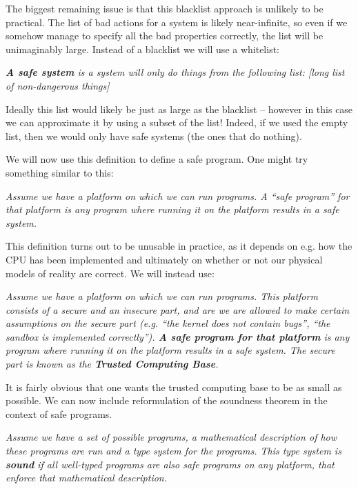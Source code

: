 The biggest remaining issue is that this blacklist approach is unlikely to be
practical. The list of bad actions for a system is likely near-infinite, so even
if we somehow manage to specify all the bad properties correctly, the list will
be unimaginably large. Instead of a blacklist we will use a whitelist:

\vspace{0.3cm}
\begin{addmargin}{1cm}
  {\it \textbf{A safe system} is a system will only do things from the following
    list: [long list of non-dangerous things]}
\end{addmargin}
\vspace{0.3cm}

Ideally this list would likely be just as large as the blacklist -- however in
this case we can approximate it by using a subset of the list! Indeed, if we
used the empty list, then we would only have safe systems (the ones that do
nothing).

We will now use this definition to define a safe program. One might try
something similar to this:

\vspace{0.3cm}
\begin{addmargin}{1cm}
  {\it Assume we have a platform on which we can run programs. A ``safe
    program'' for that platform is any program where running it on the platform
    results in a safe system.}
\end{addmargin}
\vspace{0.3cm}

This definition turns out to be unusable in practice, as it depends on e.g. how
the CPU has been implemented and ultimately on whether or not our physical
models of reality are correct. We will instead use:

\vspace{0.3cm}
\begin{addmargin}{1cm}
  {\it Assume we have a platform on which we can run programs. This platform
    consists of a secure and an insecure part, and are we are allowed to make
    certain assumptions on the secure part (e.g. ``the kernel does not contain
    bugs'', ``the sandbox is implemented correctly''). \textbf{A safe program
      for that platform} is any program where running it on the platform results
    in a safe system. The secure part is known as the \textbf{Trusted Computing
      Base}.}
\end{addmargin}
\vspace{0.3cm}

It is fairly obvious that one wants the trusted computing base to be as small as
possible. We can now include reformulation of the soundness theorem in the
context of safe programs.

\vspace{0.3cm}
\begin{addmargin}{1cm}
  {\it Assume we have a set of possible programs, a mathematical description of
    how these programs are run and a type system for the programs. This type
    system is \textbf{sound} if all well-typed programs are also safe programs
    on any platform, that enforce that mathematical description.}
\end{addmargin}
\vspace{0.3cm}
